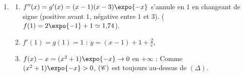 \begin{description}
\begin{enumerate}
            \begin{enumerate}
               \item {}
                  En $-\infty$ : $f(x) = \expo{-x}\left(x^2 + 1 + x\expo{x}\right)$, avec $x\expo{x} \to 0$ et $x^2 + 1 \to +\infty$,
                  $\expo{-x} \to +\infty$ : 
                  En $+\infty$ : $(x^2 + 1)\expo{-x} = \frac{x^2}{\expo{x}} + \expo{-x} \to 0$ et $x \to +\infty$ : 
               \item {}
                  $f'(x) = 2x\expo{-x} - (x^2 + 1)\expo{-x} + 1 = 1 - (x^2 - 2x + 1)\expo{-x} = 1 - (x - 1)^2\expo{-x}$,
                  \par\noindent{}
                  \[
                     \begin{array}{c|ccccc}
                        x & -\infty & & 0 & & +\infty \\ \hline
                        f'(x) & & - & 0 & + & \\ \hline
                        & +\infty & & & & +\infty \\
                        f & & \searrow & & \nearrow & \\
                        & & & 1 & &
                     \end{array}
                  \]
                  Minimum : $f(0) = 1$.
            \end{enumerate}
         \item
            \begin{enumerate}
               \item {}
                  $f''(x) = g'(x) = (x - 1)(x - 3)\expo{-x}$ s'annule en $1$ en changeant de signe (positive avant $1$,
                  n\'egative entre $1$ et $3$). 
                  ($f(1) = 2\expo{-1} + 1 \simeq 1{,}74$).
               \item {}
                  $f'(1) = g(1) = 1$ : $y = (x - 1) + 1 + \frac{2}{e}$, 
               \item {}
                  $f(x) - x = (x^2 + 1)\expo{-x} \to 0$ en $+\infty$ : 
                  Comme $(x^2 + 1)\expo{-x} > 0$, $(\mathscr{C})$ est toujours au-dessus de $(\Delta)$.

\end{enumerate}
\end{enumerate}
\end{description}
